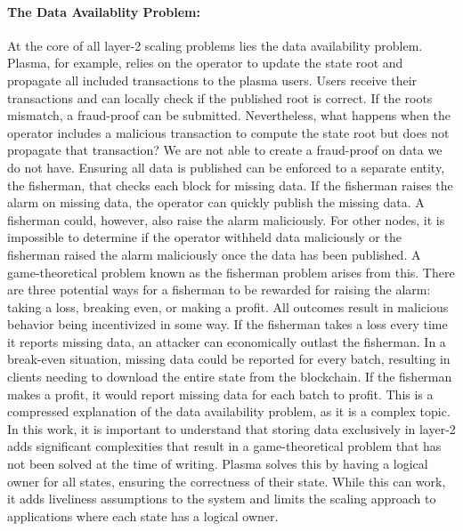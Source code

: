\documentclass[../../thesis.tex]{subfiles}
\begin{document}
\paragraph{The Data Availablity Problem:}
At the core of all layer-2 scaling problems lies the data availability problem. Plasma, for example, relies on the operator to update the state root and propagate all included transactions to the plasma users. Users receive their transactions and can locally check if the published root is correct. If the roots mismatch, a fraud-proof can be submitted. Nevertheless, what happens when the operator includes a malicious transaction to compute the state root but does not propagate that transaction? We are not able to create a fraud-proof on data we do not have. Ensuring all data is published can be enforced to a separate entity, the fisherman, that checks each block for missing data. If the fisherman raises the alarm on missing data, the operator can quickly publish the missing data. A fisherman could, however, also raise the alarm maliciously. For other nodes, it is impossible to determine if the operator withheld data maliciously or the fisherman raised the alarm maliciously once the data has been published. A game-theoretical problem known as the fisherman problem \cite{ethereum2018data} arises from this. There are three potential ways for a fisherman to be rewarded for raising the alarm: taking a loss, breaking even, or making a profit. All outcomes result in malicious behavior being incentivized in some way. If the fisherman takes a loss every time it reports missing data, an attacker can economically outlast the fisherman. In a break-even situation, missing data could be reported for every batch, resulting in clients needing to download the entire state from the blockchain. If the fisherman makes a profit, it would report missing data for each batch to profit. This is a compressed explanation of the data availability problem, as it is a complex topic. In this work, it is important to understand that storing data exclusively in layer-2 adds significant complexities that result in a game-theoretical problem that has not been solved at the time of writing. Plasma solves this by having a logical owner for all states, ensuring the correctness of their state.  While this can work, it adds liveliness assumptions to the system and limits the scaling approach to applications where each state has a logical owner. 
\end{document}

